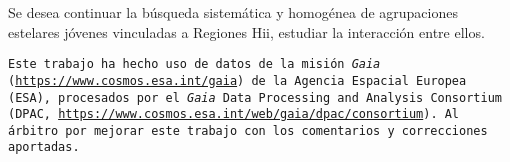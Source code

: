 \documentclass[baaa]{baaa}
\begin{document}


Se desea continuar la b\'usqueda sistem\'atica y
homog\'enea de agrupaciones estelares j\'ovenes vinculadas a Regiones H{\sc ii}, estudiar la interacci\'on entre ellos. 






\begin{acknowledgement}

\texttt{Este trabajo ha hecho uso de datos de la misión \emph{Gaia} (\url{https://www.cosmos.esa.int/gaia}) de la Agencia Espacial Europea (ESA), procesados por el \emph{Gaia} Data Processing and Analysis Consortium (DPAC, \url{https://www.cosmos.esa.int/web/gaia/dpac/consortium}). Al \'arbitro por mejorar este trabajo con los comentarios y correcciones aportadas. }

\end{acknowledgement}
\end{document}
